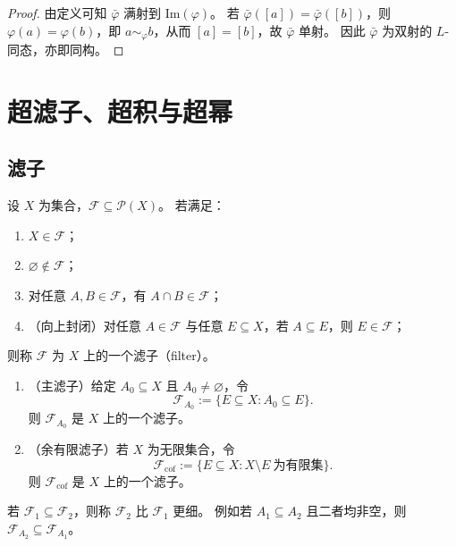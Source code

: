 \documentclass[lang=cn,a4paper,newtx,section]{elegantbook}
\begin{document}
\begin{proof}
由定义可知 $\bar\varphi$ 满射到 $\mathrm{Im}(\varphi)$。
若 $\bar\varphi([a])=\bar\varphi([b])$，则 $\varphi(a)=\varphi(b)$，即 $a\sim_{\varphi} b$，从而 $[a]=[b]$，故 $\bar\varphi$ 单射。
因此 $\bar\varphi$ 为双射的 $L$-同态，亦即同构。
\end{proof}

\chapter{超滤子、超积与超幂}

\section{滤子}

\begin{definition}[滤子]
设 $X$ 为集合，$\mathcal F\subseteq\mathcal P(X)$。
若满足：
\begin{enumerate}
  \item $X\in\mathcal F$；
  \item $\varnothing\notin\mathcal F$；
  \item 对任意 $A,B\in\mathcal F$，有 $A\cap B\in\mathcal F$；
  \item （向上封闭）对任意 $A\in\mathcal F$ 与任意 $E\subseteq X$，若 $A\subseteq E$，则 $E\in\mathcal F$；
\end{enumerate}
则称 $\mathcal F$ 为 $X$ 上的一个滤子（filter）。
\end{definition}

\begin{example}
\begin{enumerate}
  \item （主滤子）给定 $A_0\subseteq X$ 且 $A_0\neq\varnothing$，令
  \[
    \mathcal F_{A_0}:=\{E\subseteq X: A_0\subseteq E\}.
  \]
  则 $\mathcal F_{A_0}$ 是 $X$ 上的一个滤子。
  \item （余有限滤子）若 $X$ 为无限集合，令
  \[
    \mathcal F_{\mathrm{cof}}:=\{E\subseteq X: X\setminus E\ \text{为有限集}\}.
  \]
  则 $\mathcal F_{\mathrm{cof}}$ 是 $X$ 上的一个滤子。
\end{enumerate}
\end{example}

\begin{remark}
若 $\mathcal F_1\subseteq\mathcal F_2$，则称 $\mathcal F_2$ 比 $\mathcal F_1$ 更细。
例如若 $A_1\subseteq A_2$ 且二者均非空，则 $\mathcal F_{A_2}\subseteq\mathcal F_{A_1}$。
\end{remark}
\end{document}
